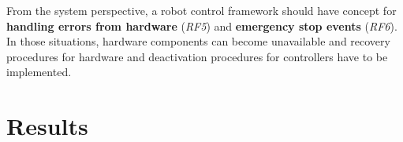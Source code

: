 \documentclass[journal]{IEEEtran}
\begin{document}
From the system perspective, a robot control framework should have concept for \textbf{handling errors from hardware} (\emph{RF5}) and \textbf{emergency stop events} (\emph{RF6}). In those situations, hardware components can become unavailable and recovery procedures for hardware and deactivation procedures for controllers have to be implemented.


\section{Results}
\label{sec:results}
\end{document}

